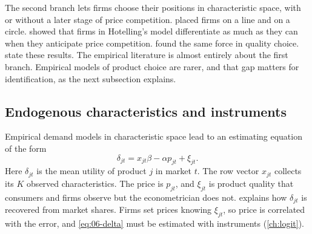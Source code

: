 The second branch lets firms choose their positions in characteristic space, with or without a later stage of
price competition. \citet{Hotelling1929} placed firms on a line and \citet{Salop1979} on a circle.
\citet{DAspremontGabszewiczThisse1979} showed that firms in Hotelling's model differentiate as much as they can
when they anticipate price competition. \citet{ShakedSutton1982} found the same force in quality choice.
 state these results. The empirical literature is almost entirely about the
first branch. Empirical models of product choice are
rarer, and that gap matters for identification, as the next subsection explains.

\subsection{Endogenous characteristics and instruments}\label{sec:06-charinst}

Empirical demand models in characteristic space lead to an estimating equation of the form
\begin{equation}\label{eq:06-delta}
\delta_{jt} = x_{jt}\beta - \alpha p_{jt} + \xi_{jt}.
\end{equation}
Here $\delta_{jt}$ is the mean utility of product $j$ in market $t$. The row vector $x_{jt}$ collects its $K$
observed characteristics. The price is $p_{jt}$, and $\xi_{jt}$ is product quality that consumers and firms
observe but the econometrician does not.  explains how $\delta_{jt}$ is recovered from market
shares. Firms set prices knowing $\xi_{jt}$, so price is correlated with the error, and \cref{eq:06-delta}
must be estimated with instruments (\cref{ch:logit}).

